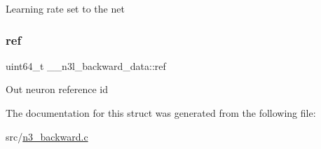 Learning rate set to the net \mbox{\label{struct____n3l__backward__data_a32ef8a9b7e79121a563b8cd5486f88d3}} 
\subsubsection{\texorpdfstring{ref}{ref}}
{\footnotesize\ttfamily uint64\+\_\+t \+\_\+\+\_\+n3l\+\_\+backward\+\_\+data\+::ref}

Out neuron reference id 

The documentation for this struct was generated from the following file\+:\begin{DoxyCompactItemize}
\item 
src/\hyperlink{n3__backward_8c}{n3\+\_\+backward.\+c}\end{DoxyCompactItemize}
